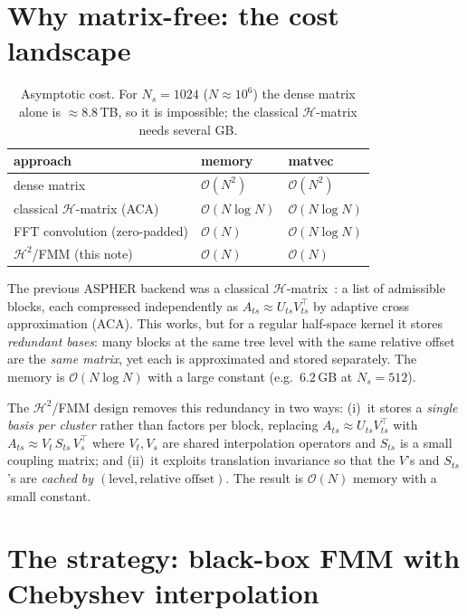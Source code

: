 \documentclass[11pt,a4paper]{article}
\newcommand{\Order}{\mathcal{O}}
\begin{document}
\section{Why matrix-free: the cost landscape}

\begin{table}[h]
\centering
\begin{tabular}{lll}
\toprule
approach & memory & matvec \\
\midrule
dense matrix                       & $\Order(N^2)$        & $\Order(N^2)$ \\
classical $\mathcal{H}$-matrix (ACA) & $\Order(N\log N)$  & $\Order(N\log N)$ \\
FFT convolution (zero-padded)      & $\Order(N)$          & $\Order(N\log N)$ \\
$\mathcal{H}^2$/FMM (this note)    & $\Order(N)$          & $\Order(N)$ \\
\bottomrule
\end{tabular}
\caption{Asymptotic cost. For $N_s=1024$ ($N\approx10^6$) the dense matrix
alone is $\approx 8.8$\,TB, so it is impossible; the classical
$\mathcal{H}$-matrix needs several GB.}
\end{table}

The previous ASPHER backend was a classical $\mathcal{H}$-matrix~\cite{Hackbusch2015}:
a list of admissible blocks, each compressed independently as $A_{ts}\approx U_{ts}
V_{ts}^\top$ by adaptive cross approximation (ACA). This works, but for a
regular half-space kernel it stores \emph{redundant bases}: many blocks at
the same tree level with the same relative offset are the \emph{same matrix},
yet each is approximated and stored separately. The memory is
$\Order(N\log N)$ with a large constant (e.g.\ $6.2$\,GB at $N_s=512$).

The $\mathcal{H}^2$/FMM design removes this redundancy in two ways:
(i)~it stores a \emph{single basis per cluster} rather than factors per
block, replacing $A_{ts}\approx U_{ts}V_{ts}^\top$ with
$A_{ts}\approx V_t\, S_{ts}\, V_s^\top$ where $V_t,V_s$ are shared
interpolation operators and $S_{ts}$ is a small coupling matrix; and
(ii)~it exploits translation invariance so that the $V$'s and $S_{ts}$'s are
\emph{cached by $(\text{level},\text{relative offset})$}. The result is
$\Order(N)$ memory with a small constant.

\section{The strategy: black-box FMM with Chebyshev interpolation}
\end{document}
